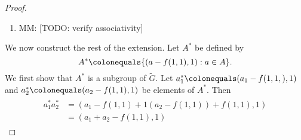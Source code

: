 \documentclass{dcthesis}
\newcommand{\mm}[1]{{\color{blue} \sf MM: [#1]}}
\newcommand{\wt}[1]{\widetilde{#1}}
\numberwithin{equation}{section}
\theoremstyle{definition}
\theoremstyle{remark}
\begin{document}
{{\begin{proof}
\begin{enumerate}
          Let $(a,g)\in A\times G$.
          We claim that
          \begin{equation}
            \label{eqn:aginverses}
            (a,g)^{-1}
            =
            (-g^{-1}a-f(g^{-1},g)-f(1,1), g^{-1}).
          \end{equation}
          We have \mm{TODO: verify inverse}
          \begin{align}
            \label{eqn:justgoforit}
            \begin{split}
              (a,g)(-g^{-1}a-f(g^{-1},g)-f(1,1), g^{-1})
              &=(,gg^{-1})\\
              &=(-f(1,1),1)\\
              (-g^{-1}a-f(g^{-1},g)-f(1,1), g^{-1})(a,g)
              &=(,g^{-1}g)\\
              &=(-f(1,1),1)
            \end{split}
          \end{align}
        \item
          \mm{TODO: verify associativity}
          \label{itm:associativity}
      \end{enumerate}
      We now construct the rest of the extension.
      Let $A^*$ be defined by
      \begin{equation}
        \label{eqn:Astar}
        A^*\colonequals
        \{(a-f(1,1), 1):a\in A\}.
      \end{equation}
      We first show that $A^*$ is a subgroup of $\wt{G}$.
      Let
      $a_1^*\colonequals(a_1-f(1,1,),1)$
      and
      $a_2^*\colonequals(a_2-f(1,1),1)$
      be elements of $A^*$.
      Then
      \begin{align}
        \label{eqn:subgroupAstar}
        \begin{split}
          a_1^*a_2^*
          &=(a_1-f(1,1)+1(a_2-f(1,1))+f(1,1), 1)\\
          &=(a_1+a_2-f(1,1),1)
        \end{split}

\end{align}
\end{proof}}}
\end{document}
